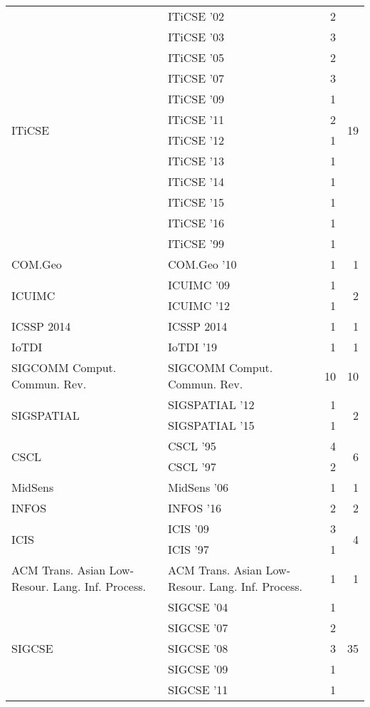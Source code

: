 \begin{table*}[t]
\begin{tabular}{llrr}
\multirow{12}{*}{ITiCSE } & ITiCSE '02 & 2 & \multirow{12}{*}{19}\\
& ITiCSE '03 & 3 &\\
& ITiCSE '05 & 2 &\\
& ITiCSE '07 & 3 &\\
& ITiCSE '09 & 1 &\\
& ITiCSE '11 & 2 &\\
& ITiCSE '12 & 1 &\\
& ITiCSE '13 & 1 &\\
& ITiCSE '14 & 1 &\\
& ITiCSE '15 & 1 &\\
& ITiCSE '16 & 1 &\\
& ITiCSE '99 & 1 &\\
\multirow{1}{*}{COM.Geo } & COM.Geo '10 & 1 & \multirow{1}{*}{1}\\
\multirow{2}{*}{ICUIMC } & ICUIMC '09 & 1 & \multirow{2}{*}{2}\\
& ICUIMC '12 & 1 &\\
\multirow{1}{*}{ICSSP 2014} & ICSSP 2014 & 1 & \multirow{1}{*}{1}\\
\multirow{1}{*}{IoTDI } & IoTDI '19 & 1 & \multirow{1}{*}{1}\\
\multirow{1}{*}{SIGCOMM Comput. Commun. Rev.} & SIGCOMM Comput. Commun. Rev. & 10 & \multirow{1}{*}{10}\\
\multirow{2}{*}{SIGSPATIAL } & SIGSPATIAL '12 & 1 & \multirow{2}{*}{2}\\
& SIGSPATIAL '15 & 1 &\\
\multirow{2}{*}{CSCL } & CSCL '95 & 4 & \multirow{2}{*}{6}\\
& CSCL '97 & 2 &\\
\multirow{1}{*}{MidSens } & MidSens '06 & 1 & \multirow{1}{*}{1}\\
\multirow{1}{*}{INFOS } & INFOS '16 & 2 & \multirow{1}{*}{2}\\
\multirow{2}{*}{ICIS } & ICIS '09 & 3 & \multirow{2}{*}{4}\\
& ICIS '97 & 1 &\\
\multirow{1}{*}{ACM Trans. Asian Low-Resour. Lang. Inf. Process.} & ACM Trans. Asian Low-Resour. Lang. Inf. Process. & 1 & \multirow{1}{*}{1}\\
\multirow{14}{*}{SIGCSE } & SIGCSE '04 & 1 & \multirow{14}{*}{35}\\
& SIGCSE '07 & 2 &\\
& SIGCSE '08 & 3 &\\
& SIGCSE '09 & 1 &\\
& SIGCSE '11 & 1 &\\

\end{tabular}
\end{table*}
